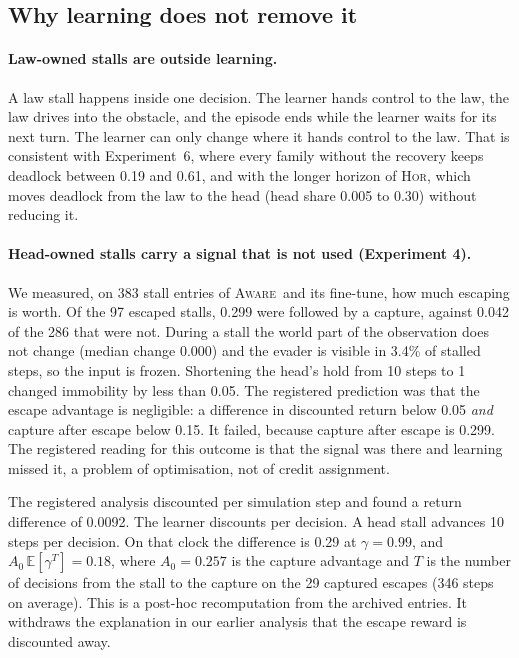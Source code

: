 \documentclass{l4dc2027}
\newcommand{\Hor}{\textsc{Hor}}
\newcommand{\Aware}{\textsc{Aware}}
\begin{document}
\subsection{Why learning does not remove it}\label{sec:learning}

\paragraph{Law-owned stalls are outside learning.} A law stall happens inside one decision. The learner hands control to the law, the law drives into the obstacle, and the episode ends while the learner waits for its next turn. The learner can only change where it hands control to the law. That is consistent with Experiment~6, where every family without the recovery keeps deadlock between 0.19 and 0.61, and with the longer horizon of \Hor, which moves deadlock from the law to the head (head share 0.005 to 0.30) without reducing it.

\paragraph{Head-owned stalls carry a signal that is not used (Experiment 4).} We measured, on 383 stall entries of \Aware\ and its fine-tune, how much escaping is worth. Of the 97 escaped stalls, 0.299 were followed by a capture, against 0.042 of the 286 that were not. During a stall the world part of the observation does not change (median change 0.000) and the evader is visible in 3.4\% of stalled steps, so the input is frozen. Shortening the head's hold from 10 steps to 1 changed immobility by less than 0.05. The registered prediction was that the escape advantage is negligible: a difference in discounted return below 0.05 \emph{and} capture after escape below 0.15. It failed, because capture after escape is 0.299. The registered reading for this outcome is that the signal was there and learning missed it, a problem of optimisation, not of credit assignment.

\begin{remark}\label{rem:signal}
The registered analysis discounted per simulation step and found a return difference of 0.0092. The learner discounts per decision. A head stall advances 10 steps per decision. On that clock the difference is 0.29 at $\gamma = 0.99$, and $A_0\,\mathbb{E}[\gamma^{T}] = 0.18$, where $A_0 = 0.257$ is the capture advantage and $T$ is the number of decisions from the stall to the capture on the 29 captured escapes (346 steps on average). This is a post-hoc recomputation from the archived entries. It withdraws the explanation in our earlier analysis that the escape reward is discounted away.
\end{remark}
\end{document}
